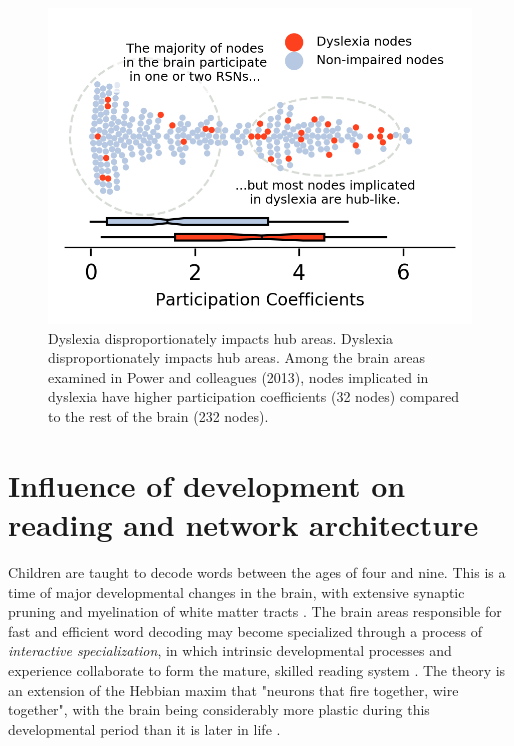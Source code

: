 \begin{figure}[h!]
\centering
\includegraphics[width=5in]{images/ch1-dyslexia-hubs.png}
    \caption{Dyslexia disproportionately impacts hub areas. Dyslexia disproportionately impacts hub areas. Among the brain areas examined in Power and colleagues (2013), nodes implicated in dyslexia have higher participation coefficients (32 nodes) compared to the rest of the brain (232 nodes).}
\label{fig:ch1-dyslexia-hubs}
\end{figure}

\section{Influence of development on reading and network architecture}

Children are taught to decode words between the ages of four and nine. This is a time of major developmental changes in the brain, with extensive synaptic pruning and myelination of white matter tracts \citep{Wandell2013}. The brain areas responsible for fast and efficient word decoding may become specialized through a process of \textit{interactive specialization}, in which intrinsic developmental processes and experience collaborate to form the mature, skilled reading system \citep{Johnson2011, Klingberg2014}. The theory is an extension of the Hebbian maxim that "neurons that fire together, wire together", with the brain being considerably more plastic during this developmental period than it is later in life \citep{Hebb1949}.

